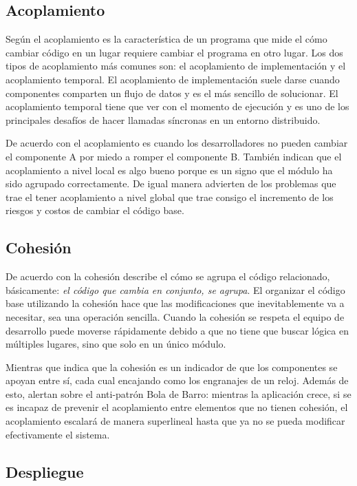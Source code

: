 \subsection{Acoplamiento}

Según \cite{newman2019monolith} el acoplamiento es la característica de un programa que mide el cómo
cambiar código en un lugar requiere cambiar el programa en otro lugar.
Los dos tipos de acoplamiento más comunes son: el acoplamiento de implementación y el acoplamiento temporal.
El acoplamiento de implementación suele darse cuando componentes comparten un flujo de datos y es el más
sencillo de solucionar.
El acoplamiento temporal tiene que ver con el momento de ejecución y es uno de los principales
desafíos de hacer llamadas síncronas en un entorno distribuido.

De acuerdo con \cite{percival2020architecture} el acoplamiento es cuando los desarrolladores no
pueden cambiar el componente A por miedo a romper el componente B. También indican que el
acoplamiento a nivel local es algo bueno porque es un signo que el módulo ha sido agrupado correctamente.
De igual manera advierten de los problemas que trae el tener acoplamiento a nivel global que trae
consigo el incremento de los riesgos y costos de cambiar el código base.


\subsection{Cohesión}

De acuerdo con \cite{newman2019monolith} la cohesión describe el cómo se agrupa el código relacionado,
básicamente: {\it el código que cambia en conjunto, se agrupa}.
El organizar el código base utilizando la cohesión hace que las modificaciones que inevitablemente
va a necesitar, sea una operación sencilla.
Cuando la cohesión se respeta el equipo de desarrollo puede moverse rápidamente debido a que no tiene
que buscar lógica en múltiples lugares, sino que solo en un único módulo.

Mientras que \cite{percival2020architecture} indica que la cohesión es un indicador de que los componentes
se apoyan entre sí, cada cual encajando como los engranajes de un reloj.
Además de esto, alertan sobre el anti-patrón Bola de Barro: mientras la aplicación crece, si se es incapaz de
prevenir el acoplamiento entre elementos que no tienen cohesión, el acoplamiento escalará de manera superlineal
hasta que ya no se pueda modificar efectivamente el sistema.


\subsection{Despliegue}


